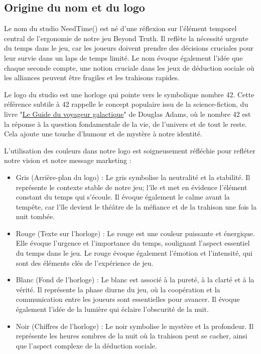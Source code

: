 \documentclass[
	article,			%
	11pt,				%
	oneside,			%
	a4paper,			%
	chapter=TITLE,
	french,			%
	sumario=tradicional
	]{base_nt}
\begin{document}
\subsection{Origine du nom et du logo}

Le nom du studio NeedTime() est né d'une réflexion sur l'élément temporel central de l'ergonomie de notre jeu Beyond Truth. Il reflète la nécessité urgente du temps dans le jeu, car les joueurs doivent prendre des décisions cruciales pour leur survie dans un laps de temps limité. Le nom évoque également l'idée que chaque seconde compte, une notion cruciale dans les jeux de déduction sociale où les alliances peuvent être fragiles et les trahisons rapides.

Le logo du studio est une horloge qui pointe vers le symbolique nombre 42. Cette référence subtile à 42 rappelle le concept populaire issu de la science-fiction, du livre "\href{https://fr.wikipedia.org/wiki/La_grande_question_sur_la_vie,_l%27Univers_et_le_reste}{Le Guide du voyageur galactique}" de Douglas Adams, où le nombre 42 est la réponse à la question fondamentale de la vie, de l'univers et de tout le reste. Cela ajoute une touche d'humour et de mystère à notre identité.

L'utilisation des couleurs dans notre logo est soigneusement réfléchie pour refléter notre vision et notre message marketing :

\begin{itemize}
    \item Gris (Arrière-plan du logo) : Le gris symbolise la neutralité et la stabilité. Il représente le contexte stable de notre jeu; l'île et met en évidence l'élément constant du temps qui s'écoule. Il évoque également le calme avant la tempête, car l'île devient le théâtre de la méfiance et de la trahison une fois la nuit tombée.
    \item Rouge (Texte sur l'horloge) : Le rouge est une couleur puissante et énergique. Elle évoque l'urgence et l'importance du temps, soulignant l'aspect essentiel du temps dans le jeu. Le rouge évoque également l'émotion et l'intensité, qui sont des éléments clés de l'expérience de jeu.
    \item Blanc (Fond de l'horloge) : Le blanc est associé à la pureté, à la clarté et à la vérité. Il représente la phase diurne du jeu, où la coopération et la communication entre les joueurs sont essentielles pour avancer. Il évoque également l'idée de la lumière qui éclaire l'obscurité de la nuit.
    \item Noir (Chiffres de l'horloge) : Le noir symbolise le mystère et la profondeur. Il représente les heures sombres de la nuit où la trahison peut se cacher, ainsi que l'aspect complexe de la déduction sociale.
\end{itemize}
\end{document}
